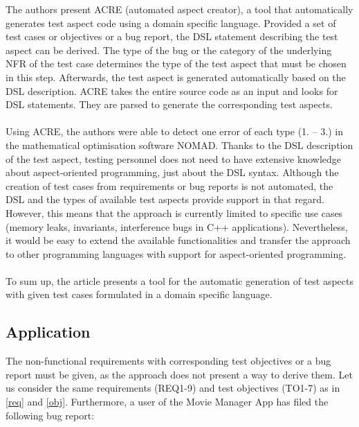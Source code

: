 The authors present ACRE (automated aspect creator), a tool that automatically generates test aspect code using a domain specific language. Provided a set of test cases or objectives or a bug report, the DSL statement describing the test aspect can be derived. The type of the bug or the category of the underlying NFR of the test case determines the type of the test aspect that must be chosen in this step. Afterwards, the test aspect is generated automatically based on the DSL description. ACRE takes the entire source code as an input and looks for DSL statements. They are parsed to generate the corresponding test aspects.\\
\\
Using ACRE, the authors were able to detect one error of each type (1. – 3.) in the mathematical optimisation software NOMAD. Thanks to the DSL description of the test aspect, testing personnel does not need to have extensive knowledge about aspect-oriented programming, just about the DSL syntax. Although the creation of test cases from requirements or bug reports is not automated, the DSL and the types of available test aspects provide support in that regard. However, this means that the approach is currently limited to specific use cases (memory leaks, invariants, interference bugs in C++ applications). Nevertheless, it would be easy to extend the available functionalities and transfer the approach to other programming languages with support for aspect-oriented programming. \\
\\
To sum up, the article presents a tool for the automatic generation of test aspects with given test cases formulated in a domain specific language.


\subsection{Application}
The non-functional requirements with corresponding test objectives or a bug report must be given, as the approach does not present a way to derive them. Let us consider the same requirements (REQ1-9) and test objectives (TO1-7) as in \autoref{req} and \autoref{obj}. Furthermore, a user of the Movie Manager App has filed the following bug report:

